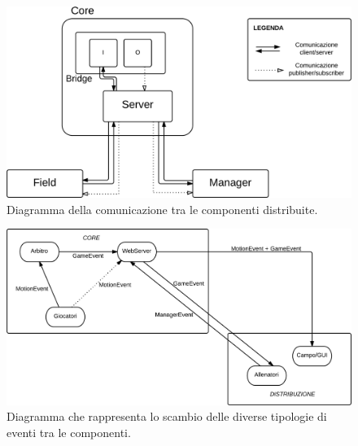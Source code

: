 \begin{figure}[htp!]
	\centering
	\includegraphics[scale=.21]{images/distribution_model}
	\caption{Diagramma della comunicazione tra le componenti distribuite.}
	\label{fig:distribuzione_analisi_workflow}
\end{figure}

\begin{figure}[htp!]
	\centering
	\includegraphics[scale=.21]{images/event_exchanging_diagram}
	\caption{Diagramma che rappresenta lo scambio delle diverse tipologie di eventi tra le componenti.}
	\label{fig:distribuzione_analisi_scambio_eventi}
\end{figure}
